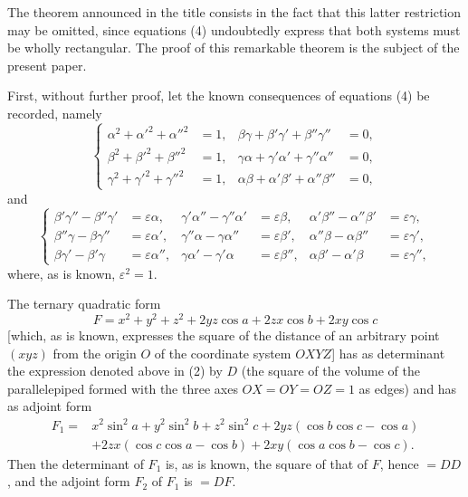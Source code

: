 \documentclass[11pt]{article}
\begin{document}
The theorem announced in the title consists in the fact that this latter restriction may be omitted, since equations (4) undoubtedly express that both systems must be wholly rectangular. The proof of this remarkable theorem is the subject of the present paper.

First, without further proof, let the known consequences of equations (4) be recorded, namely
\begin{equation}
\left\{
\begin{aligned}
\alpha^2+\alpha'^2+\alpha''^2&=1, & \beta\gamma+\beta'\gamma'+\beta''\gamma''&=0,\\
\beta^2+\beta'^2+\beta''^2&=1, & \gamma\alpha+\gamma'\alpha'+\gamma''\alpha''&=0,\\
\gamma^2+\gamma'^2+\gamma''^2&=1, & \alpha\beta+\alpha'\beta'+\alpha''\beta''&=0,
\end{aligned}\right.
\tag{5}
\end{equation}
and
\begin{equation}
\left\{
\begin{aligned}
\beta'\gamma''-\beta''\gamma'&=\varepsilon\alpha, &
\gamma'\alpha''-\gamma''\alpha'&=\varepsilon\beta, &
\alpha'\beta''-\alpha''\beta'&=\varepsilon\gamma,\\
\beta''\gamma-\beta\gamma''&=\varepsilon\alpha', &
\gamma''\alpha-\gamma\alpha''&=\varepsilon\beta', &
\alpha''\beta-\alpha\beta''&=\varepsilon\gamma',\\
\beta\gamma'-\beta'\gamma&=\varepsilon\alpha'', &
\gamma\alpha'-\gamma'\alpha&=\varepsilon\beta'', &
\alpha\beta'-\alpha'\beta&=\varepsilon\gamma'',
\end{aligned}\right.
\tag{6}
\end{equation}
where, as is known, $\varepsilon^2=1$.

The ternary quadratic form
\[
F=x^2+y^2+z^2+2yz\cos a+2zx\cos b+2xy\cos c
\]
[which, as is known, expresses the square of the distance of an arbitrary point $(xyz)$ from the origin $O$ of the coordinate system $OXYZ$] has as determinant the expression denoted above in (2) by $D$ (the square of the volume of the parallelepiped formed with the three axes $OX=OY=OZ=1$ as edges) and has as adjoint form
\[
\begin{aligned}
F_1={}&x^2\sin^2a+y^2\sin^2b+z^2\sin^2c
+2yz(\cos b\cos c-\cos a)\\
&+2zx(\cos c\cos a-\cos b)+2xy(\cos a\cos b-\cos c).
\end{aligned}
\]
Then the determinant of $F_1$ is, as is known, the square of that of $F$, hence $=DD$, and the adjoint form $F_2$ of $F_1$ is $=DF$.
\end{document}
